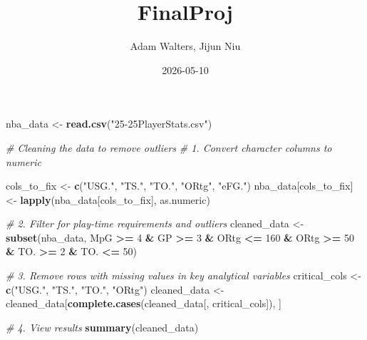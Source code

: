 \documentclass[
]{article}
\title{FinalProj}
\author{Adam Walters, Jijun Niu}
\date{2026-05-10}
\newenvironment{Shaded}{\begin{snugshade}}{\end{snugshade}}
\newcommand{\CommentTok}[1]{\textcolor[rgb]{0.56,0.35,0.01}{\textit{#1}}}
\newcommand{\DecValTok}[1]{\textcolor[rgb]{0.00,0.00,0.81}{#1}}
\newcommand{\FunctionTok}[1]{\textcolor[rgb]{0.13,0.29,0.53}{\textbf{#1}}}
\newcommand{\NormalTok}[1]{#1}
\newcommand{\OtherTok}[1]{\textcolor[rgb]{0.56,0.35,0.01}{#1}}
\newcommand{\SpecialCharTok}[1]{\textcolor[rgb]{0.81,0.36,0.00}{\textbf{#1}}}
\newcommand{\StringTok}[1]{\textcolor[rgb]{0.31,0.60,0.02}{#1}}
\begin{document}
\maketitle

\begin{Shaded}
\begin{Highlighting}[]
\NormalTok{nba\_data }\OtherTok{\textless{}{-}} \FunctionTok{read.csv}\NormalTok{(}\StringTok{"25{-}25PlayerStats.csv"}\NormalTok{)}

\CommentTok{\# Cleaning the data to remove outliers}
\CommentTok{\# 1. Convert character columns to numeric}

\NormalTok{cols\_to\_fix }\OtherTok{\textless{}{-}} \FunctionTok{c}\NormalTok{(}\StringTok{"USG."}\NormalTok{, }\StringTok{"TS."}\NormalTok{, }\StringTok{"TO."}\NormalTok{, }\StringTok{"ORtg"}\NormalTok{, }\StringTok{"eFG."}\NormalTok{)}
\NormalTok{nba\_data[cols\_to\_fix] }\OtherTok{\textless{}{-}} \FunctionTok{lapply}\NormalTok{(nba\_data[cols\_to\_fix], as.numeric)}

\CommentTok{\# 2. Filter for play{-}time requirements and outliers }
\NormalTok{cleaned\_data }\OtherTok{\textless{}{-}} \FunctionTok{subset}\NormalTok{(nba\_data, }
\NormalTok{                       MpG }\SpecialCharTok{\textgreater{}=} \DecValTok{4} \SpecialCharTok{\&} 
\NormalTok{                       GP }\SpecialCharTok{\textgreater{}=} \DecValTok{3} \SpecialCharTok{\&} 
\NormalTok{                       ORtg }\SpecialCharTok{\textless{}=} \DecValTok{160} \SpecialCharTok{\&} 
\NormalTok{                       ORtg }\SpecialCharTok{\textgreater{}=} \DecValTok{50} \SpecialCharTok{\&} 
\NormalTok{                       TO. }\SpecialCharTok{\textgreater{}=} \DecValTok{2} \SpecialCharTok{\&} 
\NormalTok{                       TO. }\SpecialCharTok{\textless{}=} \DecValTok{50}\NormalTok{)}

\CommentTok{\# 3. Remove rows with missing values in key analytical variables}
\NormalTok{critical\_cols }\OtherTok{\textless{}{-}} \FunctionTok{c}\NormalTok{(}\StringTok{"USG."}\NormalTok{, }\StringTok{"TS."}\NormalTok{, }\StringTok{"TO."}\NormalTok{, }\StringTok{"ORtg"}\NormalTok{)}
\NormalTok{cleaned\_data }\OtherTok{\textless{}{-}}\NormalTok{ cleaned\_data[}\FunctionTok{complete.cases}\NormalTok{(cleaned\_data[, critical\_cols]), ]}

\CommentTok{\# 4. View results}
\FunctionTok{summary}\NormalTok{(cleaned\_data)}
\end{Highlighting}
\end{Shaded}
\end{document}
